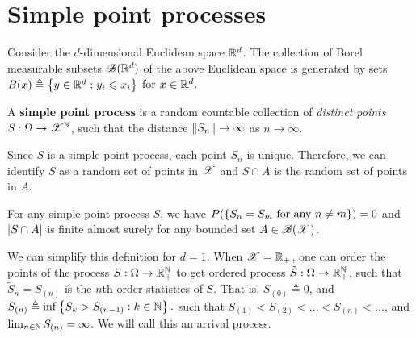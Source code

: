 \documentclass[letterpaper,10pt,english]{article}
\begin{document}
\section{Simple point processes} 
Consider the $d$-dimensional Euclidean space $\mathbb{R}^d$. 
The collection of Borel measurable subsets $\mathscr{B}(\mathbb{R}^d)$ of the above Euclidean space is generated by sets $B(x) \triangleq \left\{y \in \mathbb{R}^d: y_i \leqslant x_i\right\}$ for $x \in \mathbb{R}^d$.  
\begin{defn} 
A \textbf{simple point process} is a random countable collection of \emph{distinct points} $S: \Omega \to \mathscr{X}^{\mathbb{N}}$, 
such that the distance $\left\lVert S_n\right\rVert \to \infty$ as $n \to \infty$. 
\end{defn}
\begin{rem}
Since $S$ is a simple point process, each point $S_n$ is unique. 
Therefore, we can identify $S$ as a random set of points in $\mathscr{X}$ and $S\cap A$ is the random set of points in $A$. 
\end{rem}
\begin{rem}
For any simple point process $S$, we have $P(\left\{S_n = S_m \text{ for any } n \neq m\right\}) = 0$ and $\left\lvert S\cap A\right\rvert$ is finite almost surely for any bounded set $A \in \mathscr{B}(\mathscr{X})$.
\end{rem}
\begin{shaded}
\begin{exmp} 
We can simplify this definition for $d=1$. 
When $\mathscr{X} = \mathbb{R}_+$, one can order the points of the process $S: \Omega \to \mathbb{R}_+^{\mathbb{N}}$ to get ordered process $\tilde{S}: \Omega \to \mathbb{R}_+^{\mathbb{N}}$, 
such that $\tilde{S}_n = S_{(n)}$ is the $n$th order statistics of $S$. 
That is, $S_{(0)} \triangleq 0$, 
and 
$
S_{(n)} \triangleq \inf\left\{S_k > S_{(n-1)}: k \in \mathbb{N}\right\}. 
$ 
such that $S_{(1)} < S_{(2)} < \dots < S_{(n)} < \dots$, and $\lim_{n \in \mathbb{N}}S_{(n)} = \infty$. 
We will call this an arrival process. 
\end{exmp}
\end{shaded}
\end{document}
